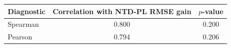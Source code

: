 \begin{tabular}{@{}l c c@{}}
\toprule
Diagnostic & Correlation with NTD-PL RMSE gain & \(p\)-value \\
\midrule
Spearman & 0.800 & 0.200\\
Pearson & 0.794 & 0.206\\
\bottomrule
\end{tabular}
